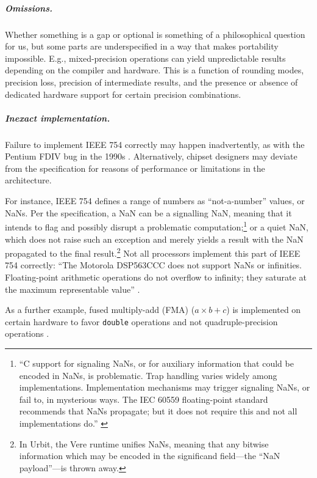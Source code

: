 \documentclass[twoside]{article}
\begin{document}
\subparagraph{Omissions.}

Whether something is a gap or optional is something of a philosophical question for us, but some parts are underspecified in a way that makes portability impossible.  E.g., mixed-precision operations can yield unpredictable results depending on the compiler and hardware.  This is a function of rounding modes, precision loss, precision of intermediate results, and the presence or absence of dedicated hardware support for certain precision combinations.

\subparagraph{Inexact implementation.}

Failure to implement IEEE 754 correctly may happen inadvertently, as with the Pentium FDIV bug in the 1990s \citep{Edelman1997}.  Alternatively, chipset designers may deviate from the specification for reasons of performance or limitations in the architecture.

For instance, IEEE 754 defines a range of numbers as “not-a-number” values, or NaNs.  Per the specification, a NaN can be a signalling NaN, meaning that it intends to flag and possibly disrupt a problematic computation;\footnote{“C support for signaling NaNs, or for auxiliary information that could be encoded in NaNs, is problematic.  Trap handling varies widely among implementations. Implementation mechanisms may trigger signaling NaNs, or fail to, in mysterious ways.  The IEC 60559 floating-point standard recommends that NaNs propagate; but it does not require this and not all implementations do.”  \citep[p.~339]{Jones2008}} or a quiet NaN, which does not raise such an exception and merely yields a result with the NaN propagated to the final result.\footnote{In Urbit, the Vere runtime unifies NaNs, meaning that any bitwise information which may be encoded in the significand field—the “NaN payload”—is thrown away.}  Not all processors implement this part of IEEE 754 correctly:  “The Motorola DSP563CCC does not support NaNs or infinities.  Floating-point arithmetic operations do not overflow to infinity; they saturate at the maximum representable value” \citep[p.~338]{Jones2008}.

As a further example, fused multiply-add (FMA) ($a \times b + c$) is implemented on certain hardware to favor \texttt{double} operations and not quadruple-precision operations \citep[p.~5]{Kahan1997}.
\end{document}
